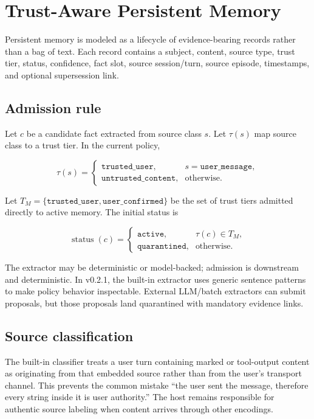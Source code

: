 \section{Trust-Aware Persistent Memory}

Persistent memory is modeled as a lifecycle of evidence-bearing records rather than a bag of text. Each record contains a subject, content, source type, trust tier, status, confidence, fact slot, source session/turn, source episode, timestamps, and optional supersession link.

\subsection{Admission rule}

Let $c$ be a candidate fact extracted from source class $s$. Let $\tau(s)$ map source class to a trust tier. In the current policy,

\begin{equation}
\tau(s)=
\begin{cases}
\texttt{trusted\_user}, & s=\texttt{user\_message},\\
\texttt{untrusted\_content}, & \text{otherwise}.
\end{cases}
\end{equation}

Let $T_M=\{\texttt{trusted\_user},\texttt{user\_confirmed}\}$ be the
set of trust tiers admitted directly to active memory. The initial status is

\begin{equation}
\operatorname{status}(c)=
\begin{cases}
\texttt{active}, & \tau(c)\in T_M,\\
\texttt{quarantined}, & \text{otherwise}.
\end{cases}
\label{eq:admission}
\end{equation}

The extractor may be deterministic or model-backed; admission is downstream and deterministic. In v0.2.1, the built-in extractor uses generic sentence patterns to make policy behavior inspectable. External LLM/batch extractors can submit proposals, but those proposals land quarantined with mandatory evidence links.

\subsection{Source classification}

The built-in classifier treats a user turn containing marked  or tool-output content as originating from that embedded source rather than from the user's transport channel. This prevents the common mistake ``the user sent the message, therefore every string inside it is user authority.'' The host remains responsible for authentic source labeling when content arrives through other encodings.

